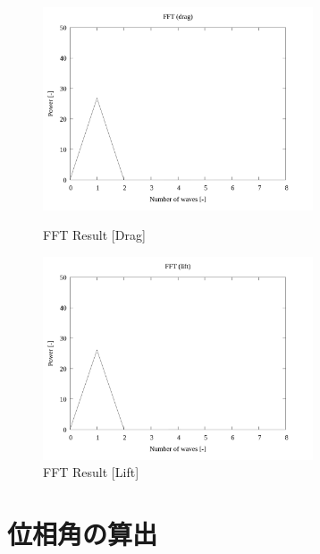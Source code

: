 \documentclass[twocolumn,a4j]{jsarticle}
\begin{document}
\begin{figure}[htbp]
    \footnotesize
    \begin{center}
        \includegraphics[width=80mm]{../images_2/07/07-1.png}
        \caption{FFT Result [Drag]}
        \includegraphics[width=80mm]{../images_2/07/07-2.png}
        \caption{FFT Result [Lift]}
    \end{center}
\end{figure}

\section{位相角の算出}
\end{document}
